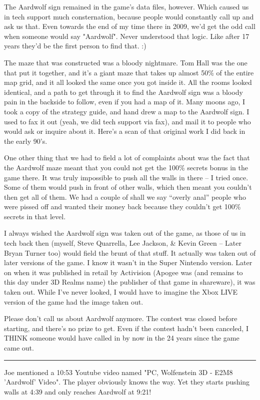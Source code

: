\par
The Aardwolf sign remained in the game’s data files, however.  Which caused us in tech support much consternation, because people would constantly call up and ask us that.  Even towards the end of my time there in 2009, we’d get the odd call when someone would say "Aardwolf".  Never understood that logic.  Like after 17 years they’d be the first person to find that.  :)\\
\par
The maze that was constructed was a bloody nightmare.  Tom Hall was the one that put it together, and it’s a giant maze that takes up almost 50\% of the entire map grid, and it all looked the same once you got inside it.  All the rooms looked identical, and a path to get through it to find the Aardwolf sign was a bloody pain in the backside to follow, even if you had a map of it.   Many moons ago, I took a copy of the strategy guide, and hand drew a map to the Aardwolf sign.  I used to fax it out (yeah, we did tech support via fax), and mail it to people who would ask or inquire about it.  Here’s a scan of that original work I did back in the early 90's.\\
\par 
One other thing that we had to field a lot of complaints about was the fact that the Aardwolf maze meant that you could not get the 100\% secrets bonus in the game there.  It was truly impossible to push all the walls in there – I tried once.  Some of them would push in front of other walls, which then meant you couldn’t then get all of them. We had a couple of shall we say “overly anal” people who were pissed off and wanted their money back because they couldn’t get 100\% secrets in that level.\\
\par
I always wished the Aardwolf sign was taken out of the game, as those of us in tech back then (myself, Steve Quarrella, Lee Jackson, \& Kevin Green – Later Bryan Turner too) would field the brunt of that stuff.  It actually was taken out of later versions of the game.  I know it wasn’t in the Super Nintendo version.  Later on when it was published in retail by Activision (Apogee was (and remains to this day under 3D Realms name) the publisher of that game in shareware), it was taken out.  While I’ve never looked, I would have to imagine the Xbox LIVE version of the game had the image taken out.\\
\par
Please don’t call us about Aardwolf anymore.  The contest was closed before starting, and there’s no prize to get.  Even if the contest hadn’t been canceled, I THINK someone would have called in by now in the 24 years since the game came out.\\
\noindent\rule{\textwidth}{0.7pt}
Joe mentioned a 10:53 Youtube video named "PC, Wolfenstein 3D - E2M8 'Aardwolf' Video". The player obviously knows the way. Yet they starts pushing walls at 4:39 and only reaches Aardwolf at 9:21!\\

\begin{figure}[H]
\label{aardwold_solution}
\end{figure}
